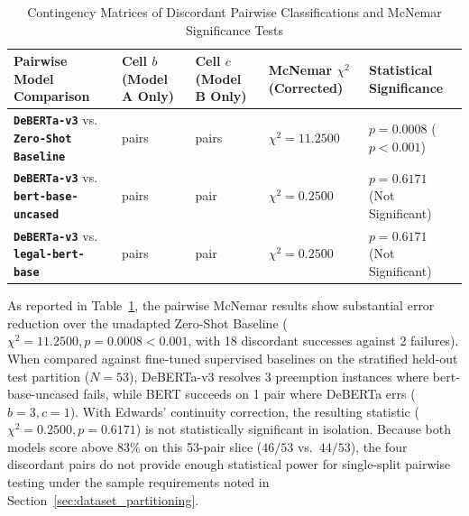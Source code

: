 \begin{table}[htbp]
    \centering
    \footnotesize
    \setlength{\tabcolsep}{4.0pt}
    \renewcommand{\arraystretch}{0.84}
    \caption[Contingency Matrices and McNemar Pairwise Significance Tests]{Contingency Matrices of Discordant Pairwise Classifications and McNemar Significance Tests}
    \label{tab:mcnemar_contingency_results}
    \begin{tabularx}{\linewidth}{>{\RaggedRight\arraybackslash}p{4.0cm}>{\Centering\arraybackslash}X>{\Centering\arraybackslash}X>{\Centering\arraybackslash}p{2.2cm}>{\Centering\arraybackslash}p{2.2cm}}
        \toprule
        \textbf{Pairwise Model Comparison} & \shortstack[c]{\textbf{Cell $b$}\\\textbf{(Model A Only)}} & \shortstack[c]{\textbf{Cell $c$}\\\textbf{(Model B Only)}} & \shortstack[c]{\textbf{McNemar $\chi^2$}\\\textbf{(Corrected)}} & \shortstack[c]{\textbf{Statistical}\\\textbf{Significance}} \\
        \midrule
        \textbf{\texttt{DeBERTa-v3}} vs. \textbf{\texttt{Zero-Shot Baseline}} & 18 pairs & 2 pairs & $\chi^2 = 11.2500$ & $p = 0.0008$ ($p < 0.001$) \\
        \textbf{\texttt{DeBERTa-v3}} vs. \textbf{\texttt{bert-base-uncased}} & 3 pairs & 1 pair & $\chi^2 = 0.2500$ & $p = 0.6171$ (Not Significant) \\
        \textbf{\texttt{DeBERTa-v3}} vs. \textbf{\texttt{legal-bert-base}} & 3 pairs & 1 pair & $\chi^2 = 0.2500$ & $p = 0.6171$ (Not Significant) \\
        \bottomrule
    \end{tabularx}
\end{table}

As reported in Table~\ref{tab:mcnemar_contingency_results}, the pairwise McNemar results show substantial error reduction over the unadapted Zero-Shot Baseline ($\chi^2 = 11.2500, p = 0.0008 < 0.001$, with 18 discordant successes against 2 failures). When compared against fine-tuned supervised baselines on the stratified held-out test partition ($N = 53$), DeBERTa-v3 resolves 3 preemption instances where bert-base-uncased fails, while BERT succeeds on 1 pair where DeBERTa errs ($b=3, c=1$). With Edwards' continuity correction, the resulting statistic ($\chi^2 = 0.2500, p = 0.6171$) is not statistically significant in isolation. Because both models score above 83\% on this 53-pair slice ($46/53$ vs.\ $44/53$), the four discordant pairs do not provide enough statistical power for single-split pairwise testing under the sample requirements noted in Section~\ref{sec:dataset_partitioning}.

